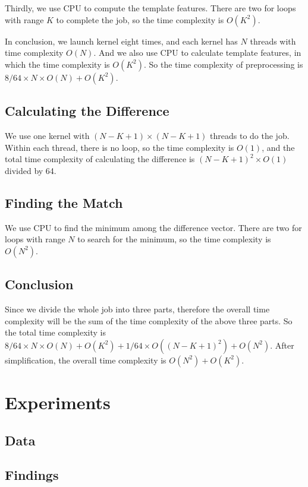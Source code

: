 \documentclass[12pt, a4paper]{article}
\begin{document}
    Thirdly, we use CPU to compute the template features. There are two for loops
    with range $K$ to complete the job, so the time complexity is $O(K^2)$.

    In conclusion, we launch kernel eight times, and each kernel has $N$ threads with
    time complexity $O(N)$. And we also use CPU to calculate template features, in which
    the time complexity is $O(K^2)$. So the time complexity of preprocessing is
    $8/64 \times N \times O(N) + O(K^2)$.
  \subsection{Calculating the Difference}
    We use one kernel with $(N - K + 1) \times (N - K + 1)$ threads to do the job.
    Within each thread, there is no loop, so the time complexity is $O(1)$, and the
    total time complexity of calculating the difference is $(N - K + 1) ^ 2 \times O(1)$ divided by 64.
  \subsection{Finding the Match}
    We use CPU to find the minimum among the difference vector. There are two for
    loops with range $N$ to search for the minimum, so the time complexity is $O(N ^ 2)$.
  \subsection{Conclusion}
    Since we divide the whole job into three parts, therefore the overall time complexity
    will be the sum of the time complexity of the above three parts. So the total
    time complexity is $8/64 \times N \times O(N) + O(K^2) + 1/64 \times O((N - K + 1) ^ 2) + O(N ^ 2)$.
    After simplification, the overall time complexity is $O(N ^ 2) + O(K ^ 2)$.


\section{Experiments}
  \subsection{Data}
  \subsection{Findings}
\end{document}
